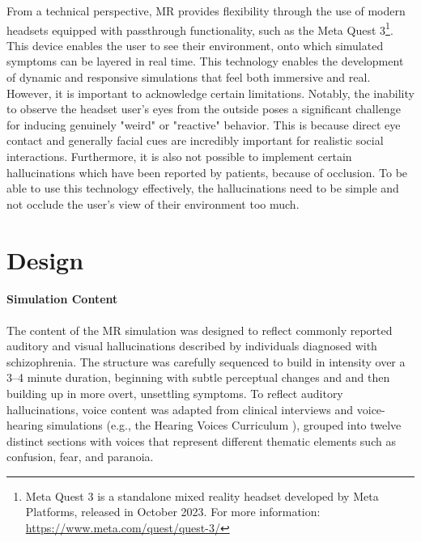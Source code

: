 From a technical perspective, MR provides flexibility through the use of modern headsets equipped with passthrough functionality, such as the Meta Quest 3\footnote{Meta Quest 3 is a standalone mixed reality headset developed by Meta Platforms, released in October 2023. For more information: \url{https://www.meta.com/quest/quest-3/}}. This device enables the user to see their environment, onto which simulated symptoms can be layered in real time. This technology enables the development of dynamic and responsive simulations that feel both immersive and real.
\vspace{1em}
However, it is important to acknowledge certain limitations. Notably, the inability to observe the headset user's eyes from the outside poses a significant challenge for inducing genuinely "weird" or "reactive" behavior. This is because direct eye contact and generally facial cues are incredibly important for realistic social interactions. Furthermore, it is also not possible to implement certain hallucinations which have been reported by patients, because of occlusion. To be able to use this technology effectively, the hallucinations need to be simple and not occlude the user's view of their environment too much. 

\section{Design}

\paragraph{Simulation Content} The content of the MR simulation was designed to reflect commonly reported auditory and visual hallucinations described by individuals diagnosed with schizophrenia. The structure was carefully sequenced to build in intensity over a 3--4 minute duration, beginning with subtle perceptual changes and and then building up in more overt, unsettling symptoms. To reflect auditory hallucinations, voice content was adapted from clinical interviews and voice-hearing simulations (e.g., the Hearing Voices Curriculum \cite{Chaffin2013}), grouped into twelve distinct sections with voices that represent different thematic elements such as confusion, fear, and paranoia.

\vspace{1em}


